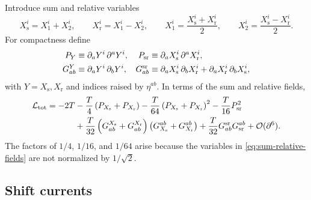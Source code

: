 \documentclass[%
preprint,
amsmath,amssymb,
aps,
prd,
10pt
]{revtex4-2}
\begin{document}
Introduce sum and relative variables
\begin{equation}
  X_{\mathrm{s}}^i = X_1^i+X_2^i,
  \qquad
  X_{\mathrm{r}}^i = X_1^i-X_2^i,
  \qquad
  X_1^i=\frac{X_{\mathrm{s}}^i+X_{\mathrm{r}}^i}{2},
  \qquad
  X_2^i=\frac{X_{\mathrm{s}}^i-X_{\mathrm{r}}^i}{2}.
  \label{eq:sum-relative-fields}
\end{equation}
For compactness define
\begin{align}
  P_Y &\equiv \partial_a Y^i\,\partial^a Y^i,
  &
  P_{\mathrm{sr}} &\equiv
    \partial_a X_{\mathrm{s}}^i\,\partial^a X_{\mathrm{r}}^i,
  \notag\\
  G^Y_{ab} &\equiv \partial_a Y^i\,\partial_b Y^i,
  &
  G^{\mathrm{sr}}_{ab} &\equiv
    \partial_a X_{\mathrm{s}}^i\,\partial_b X_{\mathrm{r}}^i
    +\partial_a X_{\mathrm{r}}^i\,\partial_b X_{\mathrm{s}}^i ,
\end{align}
with $Y=X_{\mathrm{s}},X_{\mathrm{r}}$ and indices raised by
$\eta^{ab}$.  In terms of the sum and relative fields,
\begin{align}
  \mathcal{L}_{\mathrm{tot}}
  =
  -2T
  &-\frac{T}{4}\left(P_{X_{\mathrm{s}}}+P_{X_{\mathrm{r}}}\right)
  -\frac{T}{64}
    \left(P_{X_{\mathrm{s}}}+P_{X_{\mathrm{r}}}\right)^2
  -\frac{T}{16}P_{\mathrm{sr}}^2
  \notag\\
  &+\frac{T}{32}
    \left(G^{X_{\mathrm{s}}}_{ab}+G^{X_{\mathrm{r}}}_{ab}\right)
    \left(G_{X_{\mathrm{s}}}^{ab}+G_{X_{\mathrm{r}}}^{ab}\right)
  +\frac{T}{32}
    G^{\mathrm{sr}}_{ab}G_{\mathrm{sr}}^{ab}
  +\mathcal{O}(\partial^6) .
  \label{eq:two-string-ng-sum-relative}
\end{align}
The factors of $1/4$, $1/16$, and $1/64$ arise because the variables in
\eqref{eq:sum-relative-fields} are not normalized by $1/\sqrt{2}$.

\subsection{Shift currents}
\end{document}
